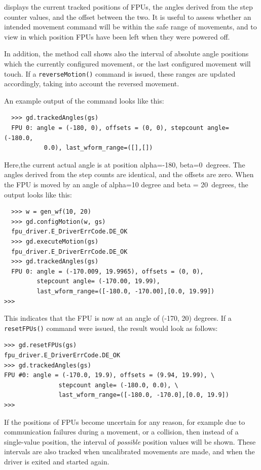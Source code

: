 \documentclass[fontsize=12,a4paper]{scrreprt}
\begin{document}
displays the current tracked positions of FPUs,
the angles derived from the step counter values, and the
offset between the two. It is useful to assess whether
an intended movement command will be within the safe range
of movements, and to view  in which position FPUs have
been left when they were powered off.

In addition, the method call shows also the interval of absolute angle
positions which the currently configured movement, or the last
configured movement will touch. If a \texttt{reverseMotion()} command
is issued, these ranges are updated accordingly, taking into account
the reversed movement.

An example output of the command looks like this:

\begin{verbatim}
  >>> gd.trackedAngles(gs)
  FPU 0: angle = (-180, 0), offsets = (0, 0), stepcount angle= (-180.0,
           0.0), last_wform_range=([],[])
\end{verbatim}

Here,the current actual angle is at position alpha=-180\degree, beta=0\degree\
degrees.  The angles derived from the step counts are identical, and
the offsets are zero. When the FPU is moved by an angle of alpha=10 degree
and beta = 20\degree\ degrees, the output looks like this:

\begin{verbatim}
  >>> w = gen_wf(10, 20)
  >>> gd.configMotion(w, gs)
  fpu_driver.E_DriverErrCode.DE_OK
  >>> gd.executeMotion(gs)
  fpu_driver.E_DriverErrCode.DE_OK
  >>> gd.trackedAngles(gs)
  FPU 0: angle = (-170.009, 19.9965), offsets = (0, 0),
         stepcount angle= (-170.00, 19.99),
         last_wform_range=([-180.0, -170.00],[0.0, 19.99])
>>>
\end{verbatim}

This indicates that the FPU is now at an angle of (-170, 20) degrees.
If a \texttt{resetFPUs()} command were issued, the result would
look as follows:


\begin{verbatim}
>>> gd.resetFPUs(gs)
fpu_driver.E_DriverErrCode.DE_OK
>>> gd.trackedAngles(gs)
FPU #0: angle = (-170.0, 19.9), offsets = (9.94, 19.99), \
               stepcount angle= (-180.0, 0.0), \
               last_wform_range=([-180.0, -170.0],[0.0, 19.9])
>>>
\end{verbatim}


If the positions of FPUs become uncertain for any reason, for example
due to communication failures during a movement, or a collision, then
instead of a single-value position, the interval of \emph{possible}
position values will be shown.  These intervals are also tracked when
uncalibrated movements are made, and when the driver is exited and
started again.
\end{document}
